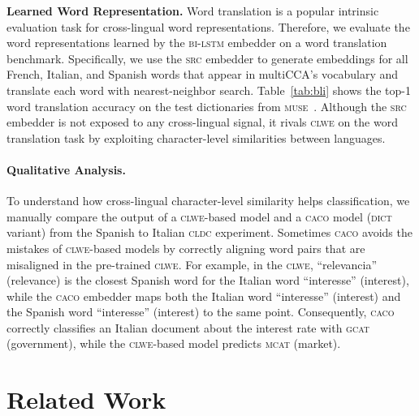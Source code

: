 \documentclass[letterpaper]{article} %
\newcommand{\citep}{\cite}
\newcommand{\abr}[1]{\textsc{#1}}
\newcommand{\name}[0]{\textsc{caco}}
\begin{document}
\textbf{Learned Word Representation.} Word translation is a popular intrinsic evaluation task for cross-lingual
word representations.
Therefore, we evaluate the word representations learned by the \abr{bi-lstm}
embedder on a word translation benchmark.
Specifically, we use the \abr{src} embedder to generate embeddings for all
French, Italian, and Spanish words that appear in multiCCA's vocabulary and
translate each word with nearest-neighbor search.
Table~\ref{tab:bli} shows the top-1 word translation accuracy on the test
dictionaries from \abr{muse}~\citep{conneau-18}.
Although the \abr{src} embedder is not exposed to any cross-lingual signal, it
rivals \abr{clwe} on the word translation task by exploiting character-level
similarities between languages.

\paragraph{Qualitative Analysis.}
To understand how cross-lingual character-level similarity helps
classification, we manually compare the output of a \abr{clwe}-based model and
a \name{} model (\abr{dict} variant) from the Spanish to Italian \abr{cldc}
experiment.
Sometimes \name{} avoids the mistakes of \abr{clwe}-based models by correctly
aligning word pairs that are misaligned in the pre-trained \abr{clwe}.
For example, in the \abr{clwe}, ``relevancia'' (relevance) is the closest
Spanish word for the Italian word ``interesse'' (interest), while the
\abr{caco} embedder maps both the Italian word ``interesse'' (interest) and the
Spanish word ``interesse'' (interest) to the same point.  Consequently,
\abr{caco} correctly classifies an Italian document about the interest rate
with \abr{gcat} (government), while the \abr{clwe}-based model predicts
\abr{mcat} (market).


\vspace{-2.96mm}
\section{Related Work}\label{sec:related}
\end{document}
